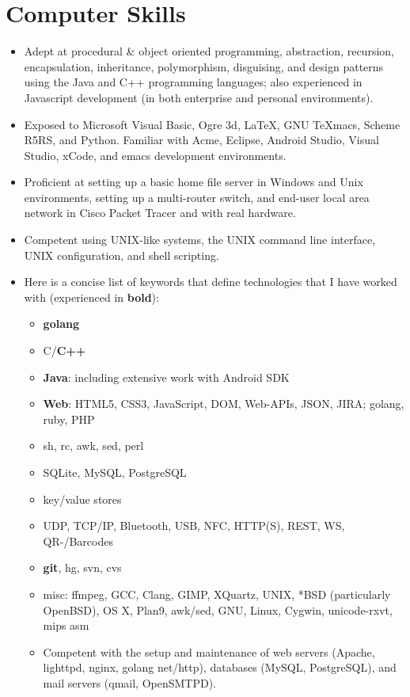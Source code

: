 \documentclass[11pt]{article}
\begin{document}
\section*{Computer Skills}
\begin{itemize}
\item Adept at procedural \& object oriented programming, abstraction, recursion, encapsulation, inheritance, polymorphism, disguising, and design patterns using the Java and C++ programming languages; also experienced in Javascript development (in both enterprise and personal environments).
\item Exposed to Microsoft Visual Basic, Ogre 3d, LaTeX, GNU TeXmacs, Scheme R5RS, and Python. Familiar with Acme, Eclipse, Android Studio, Visual Studio, xCode, and emacs development environments.
\item Proficient at setting up a basic home file server in Windows and Unix environments, setting up a multi-router switch, and end-user local area network in Cisco Packet Tracer and with real hardware.
\item Competent using UNIX-like systems, the UNIX command line interface, UNIX configuration, and shell scripting. 
\item Here is a concise list of keywords that define technologies that I have worked with (experienced in \textbf{bold}): 
\begin{itemize}
	\item \textbf{golang}
	\item C/\textbf{C++}
	\item \textbf{Java}: including extensive work with Android SDK
	\item \textbf{Web}: HTML5, CSS3, JavaScript, DOM, Web-APIs, JSON, JIRA; golang, ruby, PHP
	\item sh, rc, awk, sed, perl
	\item SQLite, MySQL, PostgreSQL
	\item key/value stores
	\item UDP, TCP/IP, Bluetooth, USB, NFC, HTTP(S), REST, WS, QR-/Barcodes
	\item \textbf{git}, hg, svn, cvs
	\item misc: ffmpeg, GCC, Clang, GIMP, XQuartz, UNIX, *BSD (particularly OpenBSD), OS X, Plan9, awk/sed, GNU, Linux, Cygwin, unicode-rxvt, mips asm
	\item Competent with the setup and maintenance of web servers (Apache, lighttpd, nginx, golang net/http), databases (MySQL, PostgreSQL), and mail servers (qmail, OpenSMTPD). 
\end{itemize}

\end{itemize}
\end{document}
